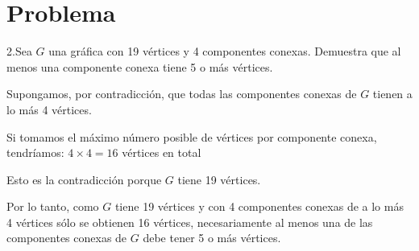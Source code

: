 \documentclass{article}
\begin{document}
\section*{Problema}
2.Sea \(G\) una gráfica con 19 vértices y 4 componentes conexas. Demuestra que al menos una componente conexa tiene 5 o más vértices.

\begin{Dem.}

Supongamos, por contradicción, que todas las componentes conexas de \(G\) tienen a lo más 4 vértices.

Si tomamos el máximo número posible de vértices por componente conexa, tendríamos: \(4 \times 4 = 16\) vértices en total {\Rightarrow\!\Leftarrow}


Esto es la contradicción porque \(G\) tiene 19 vértices.

Por lo tanto, como \(G\) tiene 19 vértices y con 4 componentes conexas de a lo más 4 vértices sólo se obtienen 16 vértices, necesariamente al menos una de las componentes conexas de \(G\) debe tener 5 o más vértices.

\end{Dem.}
\end{document}
